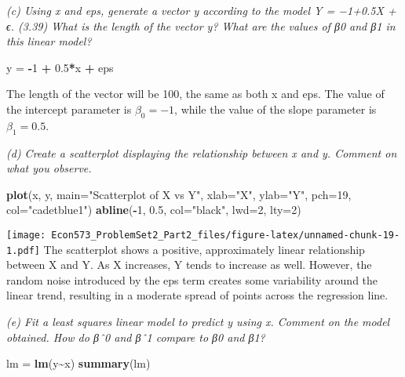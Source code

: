 \documentclass[
]{article}
\newenvironment{Shaded}{\begin{snugshade}}{\end{snugshade}}
\newcommand{\AttributeTok}[1]{\textcolor[rgb]{0.13,0.29,0.53}{#1}}
\newcommand{\DecValTok}[1]{\textcolor[rgb]{0.00,0.00,0.81}{#1}}
\newcommand{\FloatTok}[1]{\textcolor[rgb]{0.00,0.00,0.81}{#1}}
\newcommand{\FunctionTok}[1]{\textcolor[rgb]{0.13,0.29,0.53}{\textbf{#1}}}
\newcommand{\NormalTok}[1]{#1}
\newcommand{\OtherTok}[1]{\textcolor[rgb]{0.56,0.35,0.01}{#1}}
\newcommand{\SpecialCharTok}[1]{\textcolor[rgb]{0.81,0.36,0.00}{\textbf{#1}}}
\newcommand{\StringTok}[1]{\textcolor[rgb]{0.31,0.60,0.02}{#1}}
\begin{document}
\emph{(c) Using x and eps, generate a vector y according to the model Y
= −1+0.5X + ϵ. (3.39) What is the length of the vector y? What are the
values of β0 and β1 in this linear model?}

\begin{Shaded}
\begin{Highlighting}[]
\NormalTok{y }\OtherTok{=} \SpecialCharTok{{-}}\DecValTok{1} \SpecialCharTok{+} \FloatTok{0.5}\SpecialCharTok{*}\NormalTok{x }\SpecialCharTok{+}\NormalTok{ eps}
\end{Highlighting}
\end{Shaded}

The length of the vector will be 100, the same as both x and eps. The
value of the intercept parameter is \(\beta_0 = -1\), while the value of
the slope parameter is \(\beta_1 = 0.5\).

\emph{(d) Create a scatterplot displaying the relationship between x and
y. Comment on what you observe.}

\begin{Shaded}
\begin{Highlighting}[]
\FunctionTok{plot}\NormalTok{(x, y, }\AttributeTok{main=}\StringTok{"Scatterplot of X vs Y"}\NormalTok{, }\AttributeTok{xlab=}\StringTok{"X"}\NormalTok{, }\AttributeTok{ylab=}\StringTok{"Y"}\NormalTok{, }\AttributeTok{pch=}\DecValTok{19}\NormalTok{, }\AttributeTok{col=}\StringTok{"cadetblue1"}\NormalTok{)}
\FunctionTok{abline}\NormalTok{(}\SpecialCharTok{{-}}\DecValTok{1}\NormalTok{, }\FloatTok{0.5}\NormalTok{, }\AttributeTok{col=}\StringTok{"black"}\NormalTok{, }\AttributeTok{lwd=}\DecValTok{2}\NormalTok{, }\AttributeTok{lty=}\DecValTok{2}\NormalTok{)}
\end{Highlighting}
\end{Shaded}

\texttt{[image: Econ573\_ProblemSet2\_Part2\_files/figure-latex/unnamed-chunk-19-1.pdf]}
The scatterplot shows a positive, approximately linear relationship
between X and Y. As X increases, Y tends to increase as well. However,
the random noise introduced by the eps term creates some variability
around the linear trend, resulting in a moderate spread of points across
the regression line.

\emph{(e) Fit a least squares linear model to predict y using x. Comment
on the model obtained. How do βˆ0 and βˆ1 compare to β0 and β1?}

\begin{Shaded}
\begin{Highlighting}[]
\NormalTok{lm }\OtherTok{=} \FunctionTok{lm}\NormalTok{(y}\SpecialCharTok{\textasciitilde{}}\NormalTok{x)}
\FunctionTok{summary}\NormalTok{(lm)}
\end{Highlighting}
\end{Shaded}
\end{document}

